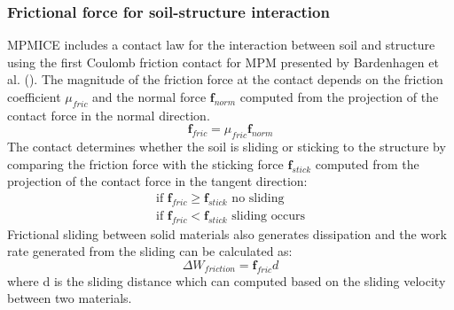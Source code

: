 \documentclass[preprint,12pt]{elsarticle}
\begin{document}
\subsubsection{Frictional force for soil-structure interaction}
MPMICE includes a contact law for the interaction between soil and structure using the first Coulomb friction contact for MPM presented by Bardenhagen et al. (\cite{MPMcontact}).  The magnitude of the friction force at the contact depends on the friction coefficient $\mu_{fric}$ and the normal force  $ \pmb{f}_{norm}$  computed from the projection of the contact force  in the normal direction.
%
\begin{equation}
   \pmb{f}_{fric} = \mu_{fric}  \pmb{f}_{norm}
\end {equation}
%
%
The contact determines whether the soil is sliding or sticking to the structure by comparing the friction force with the sticking force $\pmb{f}_{stick}$  computed from the projection of the contact force in the tangent direction:
%
\begin{equation}
\begin{gathered}
\textrm{   if    }    \pmb{f}_{fric} \geq  \pmb{f}_{stick}   \textrm{    no sliding    } \\
\textrm{    if    }   \pmb{f}_{fric} <   \pmb{f}_{stick}   \textrm{    sliding occurs    }  
\end {gathered}
\end {equation}
Frictional sliding between solid materials also generates dissipation and the work rate generated from the sliding can be calculated as:
%
\begin{equation}
   \Delta W_{friction} = \pmb{f}_{fric} d
\end {equation}
%
%
where d is the sliding distance which can computed based on the sliding velocity between two materials. 
\end{document}
